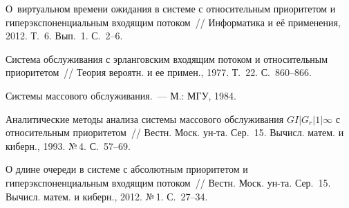 \begin{multicols}{2}
{\small\frenchspacing
{%
\begin{thebibliography}{9}

 О~виртуальном времени ожидания в сис\-те\-ме с
относительным приоритетом и гиперэкспоненциальным входящим потоком~// 
Информатика и её применения, 2012. Т.~6. Вып.~1. С.~2--6.

 Система обслуживания с эрланговским входящим
потоком и относительным приоритетом~// Теория вероятн. и ее примен.,
1977. Т.~22. С.~860--866.

 Системы массового обслуживания.~--- М.: МГУ, 1984.

 Аналитические методы анализа системы массового
обслуживания $GI|G_r|1|\infty$ с относительным приоритетом~// Вестн.
Моск. ун-та. Сер.~15. Вычисл. матем. и киберн., 1993. №\,4.
С.~57--69.


\label{end\stat}

  О длине очереди в системе с
абсолютным приоритетом и гиперэкспоненциальным входящим потоком~//
Вестн. Моск. ун-та. Сер.~15. Вычисл. матем. и киберн., 2012. №\,1.
С.~27--34.
 \end{thebibliography}
}
}


\end{multicols}